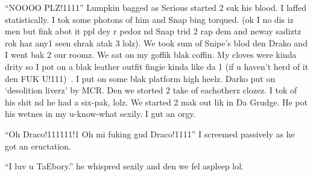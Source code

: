 \enquote{NOOOO PLZ!1111} Lumpkin bagged as Serious started 2 suk his blood. I laffed statistically. I tok some photons of him and Snap bing torqued. (ok I no dis iz men but fink abot it ppl dey r pedoz nd Snap trid 2 rap dem and neway sadiztz rok haz any1 seen shrak atak 3 lolz). We took sum of Snipe's blod den Drako and I went bak 2 our roomz. We sat on my goffik blak coffin. My cloves were kinda drity so I pot on a blak leather outfit fingie kinda like da 1  (if u haven't herd of it den FUK U!111)~. I put on some blak platform high heelz. Darko put on `desolition liverz' by MCR. Den\dotfill\newline
we storted 2 take of eachotherz clozez. I tok of his shit nd he had a six-pak, lolz. We started 2 mak out lik in Da Grudge. He pot his wetnes in my u-know-what sexily. I gut an orgy.

\begin{sloppypar}
    \enquote{Oh Draco!111111!\@1 Oh mi fuking gud Draco!1111} I screemed passively as he got an eructation.
\end{sloppypar}

\enquote{I luv u TaEbory.} he whispred sexily and den we fel aspleep lol.
